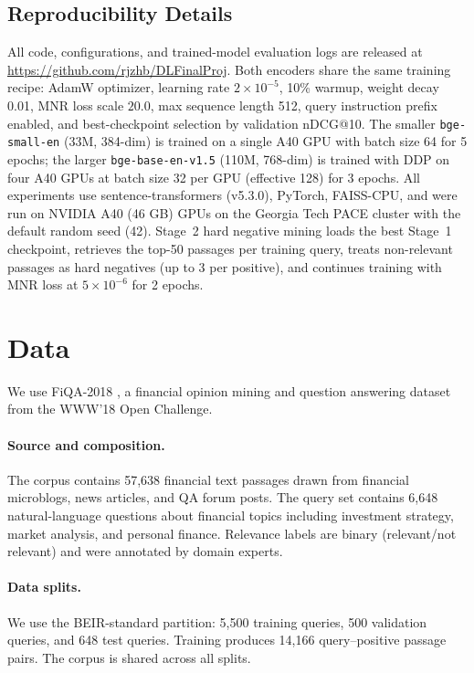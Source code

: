 \documentclass{article} %
\begin{document}
\subsection{Reproducibility Details}

All code, configurations, and trained-model evaluation logs are released at \url{https://github.com/rjzhb/DLFinalProj}.
Both encoders share the same training recipe: AdamW optimizer, learning rate $2\times 10^{-5}$, 10\% warmup, weight decay 0.01, MNR loss scale $20.0$, max sequence length 512, query instruction prefix enabled, and best-checkpoint selection by validation nDCG@10.
The smaller \texttt{bge-small-en} (33M, 384-dim) is trained on a single A40 GPU with batch size 64 for 5 epochs; the larger \texttt{bge-base-en-v1.5} (110M, 768-dim) is trained with DDP on four A40 GPUs at batch size 32 per GPU (effective 128) for 3 epochs.
All experiments use sentence-transformers (v5.3.0), PyTorch, FAISS-CPU, and were run on NVIDIA A40 (46 GB) GPUs on the Georgia Tech PACE cluster with the default random seed (42).
Stage~2 hard negative mining loads the best Stage~1 checkpoint, retrieves the top-50 passages per training query, treats non-relevant passages as hard negatives (up to 3 per positive), and continues training with MNR loss at $5\times 10^{-6}$ for 2 epochs.

\section{Data}

We use FiQA-2018 \citep{maia201818}, a financial opinion mining and question answering dataset from the WWW'18 Open Challenge.

\paragraph{Source and composition.}
The corpus contains 57,638 financial text passages drawn from financial microblogs, news articles, and QA forum posts.
The query set contains 6,648 natural-language questions about financial topics including investment strategy, market analysis, and personal finance.
Relevance labels are binary (relevant/not relevant) and were annotated by domain experts.

\paragraph{Data splits.}
We use the BEIR-standard partition: 5,500 training queries, 500 validation queries, and 648 test queries.
Training produces 14,166 query--positive passage pairs.
The corpus is shared across all splits.
\end{document}
